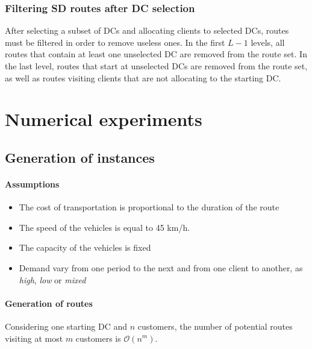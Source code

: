 \documentclass[a4paper,10pt]{article}
\begin{document}
\begin{linenumbers}
\newpage

\subsubsection{Filtering SD routes after DC selection}

After selecting a subset of DCs and allocating clients to selected DCs, routes must be filtered in order to remove useless ones. 
In the first $L-1$ levels, all routes that contain at least one unselected DC are removed from the route set. 
In the last level, routes that start at unselected DCs are removed from the route set, as well as routes visiting clients that are not allocating to the starting DC. 





\section{Numerical experiments}
\label{sec:expe}
\subsection{Generation of instances}

\paragraph{Assumptions}
\begin{itemize}
    \item The cost of transportation is proportional to the duration of the route
    \item The speed of the vehicles is equal to 45 km/h.
    \item The capacity of the vehicles is fixed
    \item Demand vary from one period to the next and from one client to another, as {\em high}, {\em low} or {\em mixed}
    \end{itemize}


\paragraph{Generation of routes}


Considering one starting DC and $n$ customers, the number of potential routes visiting at most $m$ customers 
is $\mathcal{O}(n^m)$.


\end{linenumbers}
\end{document}
